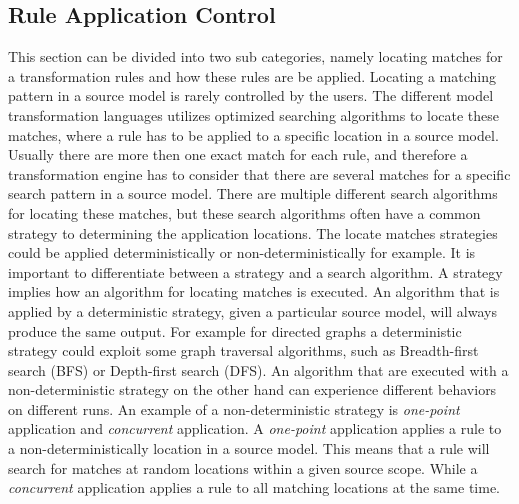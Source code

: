 \subsection{Rule Application Control}
\label{sec:app_control}

This section can be divided into two sub categories, namely locating matches for
a transformation rules and how these rules are be applied. Locating a matching
pattern in a source model is rarely controlled by the users. The different
model transformation languages utilizes optimized searching algorithms to
locate these matches, where a rule has to be applied to a specific location in
a source model. Usually there are more then one exact match for each rule, and
therefore a transformation engine has to consider that there are several
matches for a specific search pattern in a source model. There are multiple
different search algorithms for locating these matches, but these search
algorithms often have a common strategy to determining the application
locations. The locate matches strategies could be applied deterministically or
non-deterministically for example. It is important to differentiate between a
strategy and a search algorithm. A strategy implies how an algorithm for
locating matches is executed. An algorithm that is applied by a deterministic
strategy, given a particular source model, will always produce the same output.
For example for directed graphs a deterministic strategy could exploit some
graph traversal algorithms, such as Breadth-first search\cite{Dasgupta2006}
(BFS) or Depth-first\cite{Dasgupta2006} search (DFS). An algorithm that are
executed with a non-deterministic strategy on the other hand can experience
different behaviors on different runs. An example of a non-deterministic
strategy is \textit{one-point} application\cite{Czarnecki2006} and
\textit{concurrent} application. A \textit{one-point} application applies a
rule to a non-deterministically location in a source model. This means that a
rule will search for matches at random locations within a given source scope.
While a \textit{concurrent} application applies a rule to all matching
locations at the same time. 

